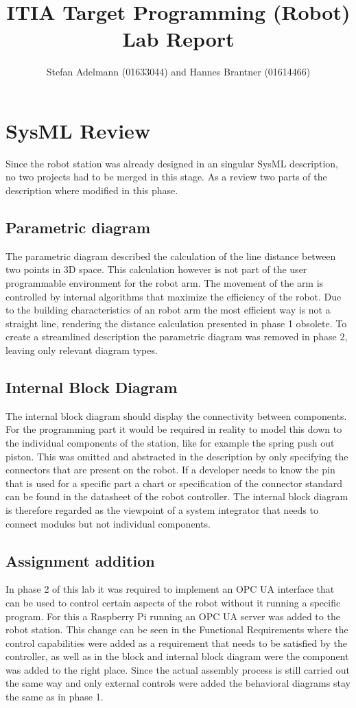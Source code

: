 \documentclass{article}
\title{ITIA Target Programming (Robot) Lab Report}
\author{Stefan Adelmann (01633044) and Hannes Brantner (01614466)}
\begin{document}
\maketitle{}
\clearpage{}
\section{SysML Review}
Since the robot station was already designed in an singular SysML description, no two projects had to be merged in this stage. As a review two parts of the description where modified in this phase.

\subsection{Parametric diagram}
The parametric diagram described the calculation of the line distance between two points in 3D space. This calculation however is not part of the user programmable environment for the robot arm. The movement of the arm is controlled by internal algorithms that maximize the efficiency of the robot. Due to the building characteristics of an robot arm the most efficient way is not a straight line, rendering the distance calculation presented in phase 1 obsolete. To create a streamlined description the parametric diagram was removed in phase 2, leaving only relevant diagram types.

\subsection{Internal Block Diagram}
The internal block diagram should display the connectivity between components. For the programming part it would be required in reality to model this down to the individual components of the station, like for example the spring push out piston. This was omitted and abstracted in the description by only specifying the connectors that are present on the robot. If a developer needs to know the pin that is used for a specific part a chart or specification of the connector standard can be found in the datasheet of the robot controller. The internal block diagram is therefore regarded as the viewpoint of a system integrator that needs to connect modules but not individual components.

\subsection{Assignment addition}
In phase 2 of this lab it was required to implement an OPC UA interface that can be used to control certain aspects of the robot without it running a specific program. For this a Raspberry Pi running an OPC UA server was added to the robot station. This change can be seen in the Functional Requirements where the control capabilities were added as a requirement that needs to be satisfied by the controller, as well as in the block and internal block diagram were the component was added to the right place. Since the actual assembly process is still carried out the same way and only external controls were added the behavioral diagrams stay the same as in phase 1.
\end{document}
